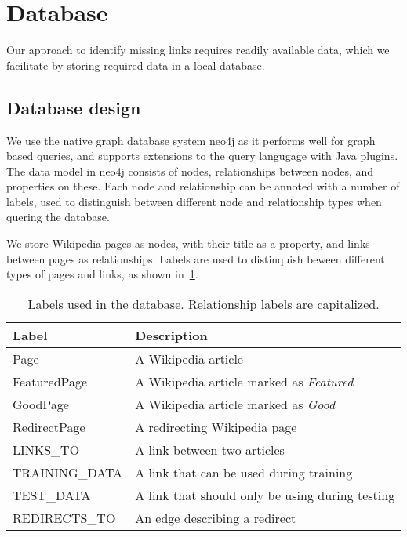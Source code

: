 \section{Database} \label{sec:db}
Our approach to identify missing links requires readily available data, which we facilitate by storing required data in a local database.

\subsection{Database design} \label{sec:db_design}
We use the native graph database system neo4j as it performs well for graph based queries, and supports extensions to the query langugage with Java plugins. The data model in neo4j consists of nodes, relationships between nodes, and properties on these. Each node and relationship can be annoted with a number of labels, used to distinguish between different node and relationship types when quering the database.

We store Wikipedia pages as nodes, with their title as a property, and links between pages as relationships. Labels are used to distinquish beween different types of pages and links, as shown in~\cref{tab:db_labels}.

\begin{table}[]
\centering
\begin{tabular}{@{}ll@{}}
\toprule
\textbf{Label}         & \textbf{Description}                            \\ \midrule
Page                   & A Wikipedia article                             \\
FeaturedPage           & A Wikipedia article marked as \emph{Featured}   \\
GoodPage               & A Wikipedia article marked as \emph{Good}       \\
RedirectPage           & A redirecting Wikipedia page                    \\ \midrule
LINKS\_TO              & A link between two articles                     \\
TRAINING\_DATA         & A link that can be used during training         \\
TEST\_DATA             & A link that should only be using during testing \\
REDIRECTS\_TO          & An edge describing a redirect                   \\ \bottomrule
\end{tabular}
\caption{Labels used in the database. Relationship labels are capitalized.}
\label{tab:db_labels}
\end{table}


